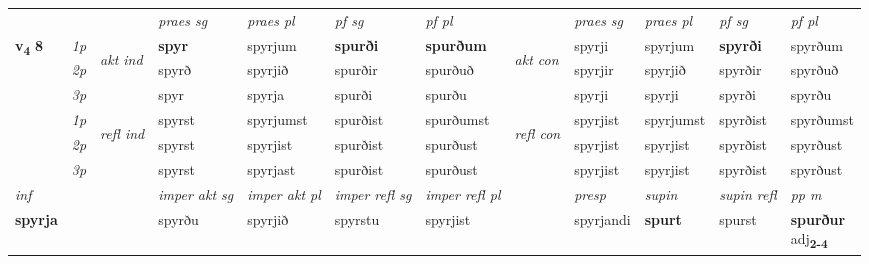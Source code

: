 \begin{longtable}[l]{X>{\footnotesize\itshape}llXXXXlXXXX}
 & &   & \textit{praes sg}  & \textit{praes pl}    & \textit{ pf sg} & \textit{pf pl} & & \textit{praes sg}  & \textit{praes pl}    & \textit{pf sg} & \textit{pf pl }  \\ \cmidrule{4-7} \cmidrule{9-12}
 \multirow{2}{*}{{{\textbf{v{\textsubscript{4}}} \Large{\textbf{8}}}}}  & 1p & \multirow{3}{*}{\begin{turn}{90}\textit{akt ind}\end{turn}} & \textbf{spyr} & spyrjum & \textbf{spurði} & \textbf{spurðum} & \multirow{3}{*}{\begin{turn}{90}\textit{akt con}\end{turn}} &spyrji & spyrjum & \textbf{spyrði} & spyrðum\\*
 & 2p &  &  spyrð  & spyrjið & spurðir & spurðuð & & spyrjir & spyrjið & spyrðir & spyrðuð \\*
 & 3p &  & spyr & spyrja & spurði & spurðu & & spyrji & spyrji& spyrði & spyrðu \\*
\cmidrule{4-7} \cmidrule{9-12}
 & 1p & \multirow{3}{*}{\begin{turn}{90}\textit{refl ind}\end{turn}}  & spyrst & spyrjumst & spurðist & spurðumst & \multirow{3}{*}{\begin{turn}{90}\textit{refl con}\end{turn}}  &spyrjist & spyrjumst & spyrðist & spyrðumst \\*
 & 2p &  & spyrst & spyrjist & spurðist & spurðust & &spyrjist & spyrjist & spyrðist & spyrðust \\*
 & 3p  & & spyrst & spyrjast & spurðist & spurðust & & spyrjist & spyrjist& spyrðist & spyrðust \\*
\cmidrule{4-7} \cmidrule{9-12}

   {\textit{inf}} & &  & \textit{imper akt sg} & \textit{imper akt pl} & \textit{imper refl sg} & \textit{imper refl pl} && \textit{presp} & \textit{supin} & \textit{supin refl} & \textit{pp m} \\*
  {\textbf{spyrja}} & && spyrðu  & spyrjið & spyrstu & spyrjist && spyrjandi &  \textbf{spurt} & spurst & \specialcell{\textbf{spurður} \\ adj\textbf{\textsubscript{2-4}}} \\*

\midrule


\end{longtable}
